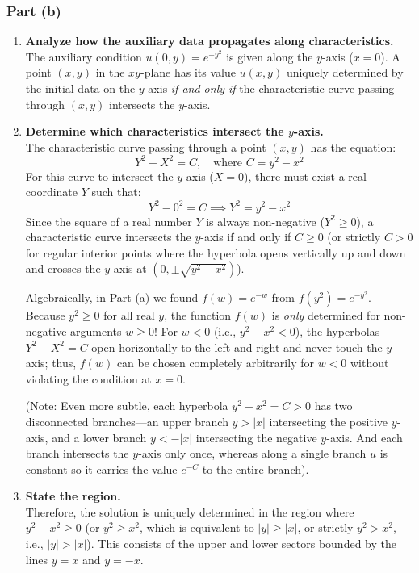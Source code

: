\documentclass[11pt]{article}
\begin{document}
\subsubsection*{Part (b)}
\begin{enumerate}[label=\textbf{Step \arabic*:}]
    \item \textbf{Analyze how the auxiliary data propagates along characteristics.} \\
    The auxiliary condition $u(0, y) = e^{-y^2}$ is given along the $y$-axis ($x = 0$). A point $(x, y)$ in the $xy$-plane has its value $u(x, y)$ uniquely determined by the initial data on the $y$-axis \emph{if and only if} the characteristic curve passing through $(x, y)$ intersects the $y$-axis.

    \item \textbf{Determine which characteristics intersect the $y$-axis.} \\
    The characteristic curve passing through a point $(x, y)$ has the equation:
    \[
    Y^2 - X^2 = C, \quad \text{where } C = y^2 - x^2
    \]
    For this curve to intersect the $y$-axis ($X = 0$), there must exist a real coordinate $Y$ such that:
    \[
    Y^2 - 0^2 = C \implies Y^2 = y^2 - x^2
    \]
    Since the square of a real number $Y$ is always non-negative ($Y^2 \ge 0$), a characteristic curve intersects the $y$-axis if and only if $C \ge 0$ (or strictly $C > 0$ for regular interior points where the hyperbola opens vertically up and down and crosses the $y$-axis at $(0, \pm\sqrt{y^2 - x^2})$). 
    
    Algebraically, in Part (a) we found $f(w) = e^{-w}$ from $f(y^2) = e^{-y^2}$. Because $y^2 \ge 0$ for all real $y$, the function $f(w)$ is \emph{only} determined for non-negative arguments $w \ge 0$! For $w < 0$ (i.e., $y^2 - x^2 < 0$), the hyperbolas $Y^2 - X^2 = C$ open horizontally to the left and right and never touch the $y$-axis; thus, $f(w)$ can be chosen completely arbitrarily for $w < 0$ without violating the condition at $x = 0$.
    
    (Note: Even more subtle, each hyperbola $y^2 - x^2 = C > 0$ has two disconnected branches—an upper branch $y > |x|$ intersecting the positive $y$-axis, and a lower branch $y < -|x|$ intersecting the negative $y$-axis. And each branch intersects the $y$-axis only once, whereas along a single branch $u$ is constant so it carries the value $e^{-C}$ to the entire branch).

    \item \textbf{State the region.} \\
    Therefore, the solution is uniquely determined in the region where $y^2 - x^2 \ge 0$ (or $y^2 \ge x^2$, which is equivalent to $|y| \ge |x|$, or strictly $y^2 > x^2$, i.e., $|y| > |x|$). This consists of the upper and lower sectors bounded by the lines $y = x$ and $y = -x$.
\end{enumerate}
\end{document}
